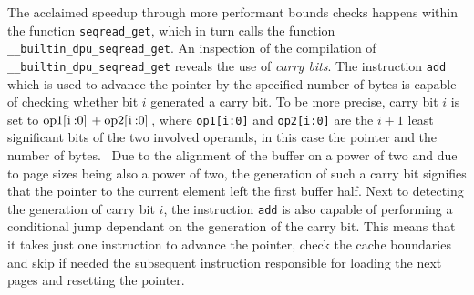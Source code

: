 The acclaimed speedup through more performant bounds checks happens within the function \lstinline|seqread_get|, which in turn calls the function \lstinline|__builtin_dpu_seqread_get|.
An inspection of the compilation of \lstinline|__builtin_dpu_seqread_get| reveals the use of \emph{carry bits}.
The instruction \lstinline|add| which is used to advance the pointer by the specified number of bytes is capable of checking whether bit \(i\) generated a carry bit.
To be more precise, carry bit \(i\) is set to \(\text{\lstinline|op1[i:0]|} + \text{\lstinline|op2[i:0]|}\), where \lstinline|op1[i:0]| and \lstinline|op2[i:0]| are the \(i + 1\) least significant bits of the two involved operands, in this case the pointer and the number of bytes.~\cite[DPU Handbook -- Specific Conditions Common To Addition and Subtraction]{upmemSDK}
Due to the alignment of the buffer on a power of two and due to page sizes being also a power of two, the generation of such a carry bit signifies that the pointer to the current element left the first buffer half.
Next to detecting the generation of carry bit \(i\), the instruction \lstinline|add| is also capable of performing a conditional jump dependant on the generation of the carry bit.
This means that it takes just one instruction to advance the pointer, check the cache boundaries and skip \Dash if needed \Dash the subsequent instruction responsible for loading the next pages and resetting the pointer.
